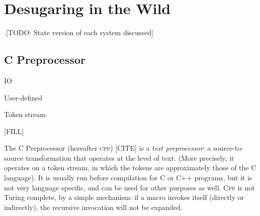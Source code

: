 \chapter{Desugaring in the Wild}

.[TODO: State version of each system discussed]

\section{C Preprocessor} \label{sec:cpre}


 IO

 User-defined

 Token stream

 [FILL]

The C Preprocessor (hereafter \textsc{cpp}) [CITE] is a \emph{text
  preprocessor}: a source-to-source transformation that operates at
the level of text. (More precisely, it operates on a token stream, in
which the tokens are approximately those of the C language). It is
usually run before compilation for C or C++ programs, but it is not
very language specific, and can be used for other purposes as well.
\textsc{Cpp} is not Turing complete, by a simple mechanism: if a macro
invokes itself (directly or indirectly), the recursive invocation
will not be expanded.

